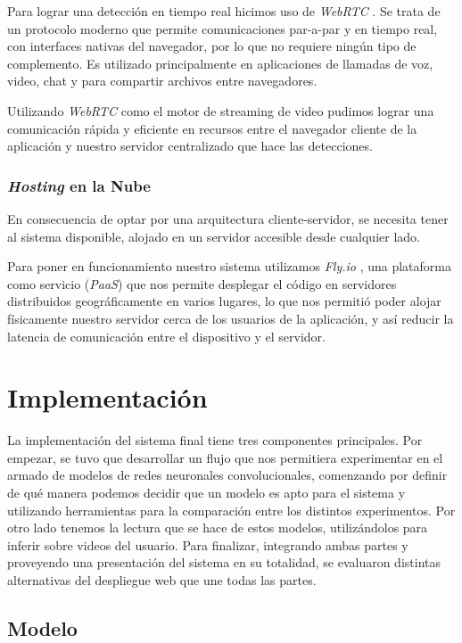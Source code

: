 \documentclass[a4paper]{article}
\begin{document}
Para lograr una detección en tiempo real hicimos uso de \textit{WebRTC} \cite{webrtc}. Se trata de un protocolo moderno que permite comunicaciones par-a-par y en tiempo real, con interfaces nativas del navegador, por lo que no requiere ningún tipo de complemento. Es utilizado principalmente en aplicaciones de llamadas de voz, video, chat y para compartir archivos entre navegadores.

Utilizando \textit{WebRTC} como el motor de streaming de video pudimos lograr una comunicación rápida y eficiente en recursos entre el navegador cliente de la aplicación y nuestro servidor centralizado que hace las detecciones.

\subsubsection{\textit{Hosting} en la Nube}

En consecuencia de optar por una arquitectura cliente-servidor, se necesita tener al sistema disponible, alojado en un servidor accesible desde cualquier lado.

Para poner en funcionamiento nuestro sistema utilizamos \textit{Fly.io} \cite{flyio}, una plataforma como servicio (\textit{PaaS}) que nos permite desplegar el código en servidores distribuidos geográficamente en varios lugares, lo que nos permitió poder alojar físicamente nuestro servidor cerca de los usuarios de la aplicación, y así reducir la latencia de comunicación entre el dispositivo y el servidor.

\section{Implementación}

La implementación del sistema final tiene tres componentes principales. Por empezar, se tuvo que desarrollar un flujo que nos permitiera experimentar en el armado de modelos de redes neuronales convolucionales, comenzando por definir de qué manera podemos decidir que un modelo es apto para el sistema y utilizando herramientas para la comparación entre los distintos experimentos. Por otro lado tenemos la lectura que se hace de estos modelos, utilizándolos para inferir sobre videos del usuario. Para finalizar, integrando ambas partes y proveyendo una presentación del sistema en su totalidad, se evaluaron distintas alternativas del despliegue web que une todas las partes.

\subsection{Modelo}
\end{document}
